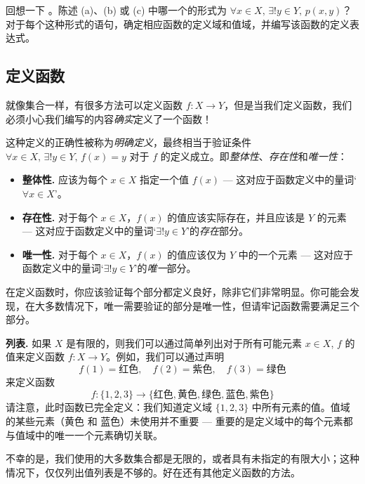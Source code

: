 \begin{exercise}
回想一下 。陈述 (a)、(b) 或 (c) 中哪一个的形式为 $\forall x \in X,\, \exists ! y \in Y,\, p(x,y)$？对于每个这种形式的语句，确定相应函数的定义域和值域，并编写该函数的定义表达式。
\end{exercise}

\subsection*{定义函数}

就像集合一样，有很多方法可以定义函数 $f : X \to Y$，但是当我们定义函数，我们必须小心我们编写的内容\textit{确实}定义了一个函数！

这种定义的正确性被称为\textit{明确定义}，最终相当于验证条件 $\forall x \in X,\, \exists ! y \in Y,\, f(x)=y$ 对于 $f$ 的定义成立。即\textit{整体性}、\textit{存在性}和\textit{唯一性}：
\begin{itemize}
\item \textbf{整体性. } 应该为每个 $x \in X$ 指定一个值 $f(x)$ --- 这对应于函数定义中的量词`$\forall x \in X$'。
\item \textbf{存在性. } 对于每个 $x \in X$，$f(x)$ 的值应该实际存在，并且应该是 $Y$ 的元素 --- 这对应于函数定义中的量词`$\exists ! y \in Y$'的\textit{存在}部分。
\item \textbf{唯一性. } 对于每个 $x \in X$，$f(x)$ 的值应该仅为 $Y$ 中的一个元素 --- 这对应于函数定义中的量词`$\exists ! y \in Y$'的\textit{唯一}部分。
\end{itemize}

在定义函数时，你应该验证每个部分都定义良好，除非它们非常明显。你可能会发现，在大多数情况下，唯一需要验证的部分是唯一性，但请牢记函数需要满足三个部分。

\textbf{列表. } 如果 $X$ 是有限的，则我们可以通过简单列出对于所有可能元素 $x \in X$, $f$ 的值来定义函数 $f : X \to Y$。例如，我们可以通过声明
\[ f(1) = \mathsf{红色}, \quad f(2) = \mathsf{紫色}, \quad f(3) = \mathsf{绿色} \]
来定义函数
\[ f : \{ 1, 2, 3 \} \to \{ \mathsf{红色}, \mathsf{黄色}, \mathsf{绿色}, \mathsf{蓝色}, \mathsf{紫色} \} \]
请注意，此时函数已完全定义：我们知道定义域 $\{ 1, 2, 3 \}$ 中所有元素的值。值域的某些元素（$\mathsf{黄色}$ 和 $\mathsf{蓝色}$）未使用并不重要 --- 重要的是定义域中的每个元素都与值域中的唯一一个元素确切关联。

不幸的是，我们使用的大多数集合都是无限的，或者具有未指定的有限大小；这种情况下，仅仅列出值列表是不够的。好在还有其他定义函数的方法。

